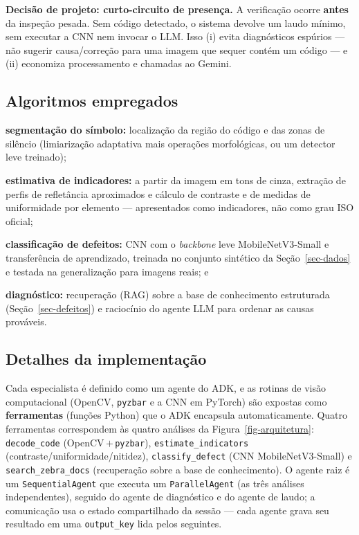 \documentclass[
	article,			%
	11pt,				%
	oneside,			%
	a4paper,			%
	english,			%
	brazilian,			%
	sumario=tradicional
	]{abntex2}
\begin{document}
\noindent\textbf{Decisão de projeto: curto-circuito de presença.} A verificação
ocorre \textbf{antes} da inspeção pesada. Sem código detectado, o sistema devolve
um laudo mínimo, sem executar a CNN nem invocar o LLM. Isso (i) evita diagnósticos
espúrios --- não sugerir causa/correção para uma imagem que sequer contém um código
--- e (ii) economiza processamento e chamadas ao Gemini.

\subsection{Algoritmos empregados}

\begin{alineas}
	\item \textbf{segmentação do símbolo:} localização da região do código e das
	zonas de silêncio (limiarização adaptativa mais operações morfológicas, ou um
	detector leve treinado);
	\item \textbf{estimativa de indicadores:} a partir da imagem em tons de cinza,
	extração de perfis de refletância aproximados e cálculo de contraste e de
	medidas de uniformidade por elemento --- apresentados como indicadores, não
	como grau ISO oficial;
	\item \textbf{classificação de defeitos:} CNN com o \textit{backbone} leve
	MobileNetV3-Small e transferência de aprendizado, treinada
	no conjunto sintético da Seção~\ref{sec-dados} e testada na generalização para
	imagens reais; e
	\item \textbf{diagnóstico:} recuperação (RAG) sobre a base de conhecimento
	estruturada (Seção~\ref{sec-defeitos}) e raciocínio do agente LLM para ordenar
	as causas prováveis.
\end{alineas}

\subsection{Detalhes da implementação}

Cada especialista é definido como um agente do ADK, e as rotinas de visão
computacional (OpenCV, \texttt{pyzbar} e a CNN em PyTorch) são expostas como
\textbf{ferramentas} (funções Python) que o ADK encapsula automaticamente. Quatro
ferramentas correspondem às quatro análises da Figura~\ref{fig-arquitetura}:
\texttt{decode\_code} (OpenCV\,$+$\,\texttt{pyzbar}),
\texttt{estimate\_indicators} (contraste/uniformidade/nitidez),
\texttt{classify\_defect} (CNN MobileNetV3-Small) e
\texttt{search\_zebra\_docs} (recuperação sobre a base de conhecimento). O
agente raiz é um \texttt{SequentialAgent} que executa um \texttt{ParallelAgent} (as
três análises independentes), seguido do agente de diagnóstico e do agente de laudo;
a comunicação usa o estado compartilhado da sessão --- cada agente grava seu
resultado em uma \texttt{output\_key} lida pelos seguintes.
\end{document}
